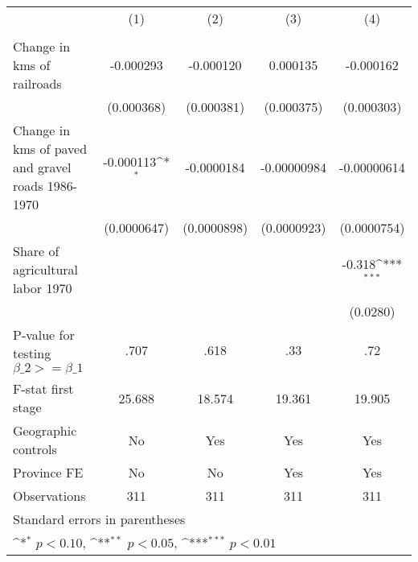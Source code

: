 {
\def\sym#1{\ifmmode^{#1}\else\(^{#1}\)\fi}
\begin{tabular}{l*{4}{c}}
\hline\hline
                &\multicolumn{1}{c}{(1)}&\multicolumn{1}{c}{(2)}&\multicolumn{1}{c}{(3)}&\multicolumn{1}{c}{(4)}\\
                &\multicolumn{1}{c}{}&\multicolumn{1}{c}{}&\multicolumn{1}{c}{}&\multicolumn{1}{c}{}\\
\hline
Change in kms of railroads&-0.000293         &-0.000120         & 0.000135         &-0.000162         \\
                &(0.000368)         &(0.000381)         &(0.000375)         &(0.000303)         \\
[1em]
Change in kms of paved and gravel roads 1986-1970&-0.000113\sym{*}  &-0.0000184         &-0.00000984         &-0.00000614         \\
                &(0.0000647)         &(0.0000898)         &(0.0000923)         &(0.0000754)         \\
[1em]
Share of agricultural labor 1970&                  &                  &                  &   -0.318\sym{***}\\
                &                  &                  &                  & (0.0280)         \\
\hline
P-value for testing $\beta\_{2} >= \beta\_{1}$&     .707         &     .618         &      .33         &      .72         \\
F-stat first stage&   25.688         &   18.574         &   19.361         &   19.905         \\
Geographic controls&       No         &      Yes         &      Yes         &      Yes         \\
Province FE     &       No         &       No         &      Yes         &      Yes         \\
Observations    &      311         &      311         &      311         &      311         \\
\hline\hline
\multicolumn{5}{l}{\footnotesize Standard errors in parentheses}\\
\multicolumn{5}{l}{\footnotesize \sym{*} \(p<0.10\), \sym{**} \(p<0.05\), \sym{***} \(p<0.01\)}\\
\end{tabular}
}
